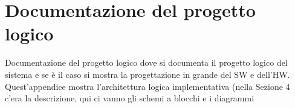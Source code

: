 \chapter{Documentazione del progetto logico}
\label{appendiceA}
\thispagestyle{empty}

\noindent Documentazione del progetto logico dove si documenta il progetto logico del sistema e se \`e il caso si mostra la progettazione in grande del SW e dell'HW. Quest'appendice mostra l'architettura logica implementativa (nella Sezione 4 c'era la descrizione, qui ci vanno gli schemi a blocchi e i diagrammi